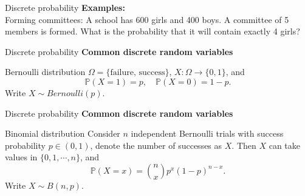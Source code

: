 \documentclass [aspectratio=169]{beamer}
\begin{document}
\begin{frame}{Discrete probability}
\textbf{Examples:}\\
Forming committees: A school has 600 girls and 400 boys. A committee of 5 members is formed. What is the probability that it will contain exactly 4 girls?
\vspace{0.1in}
\end{frame}



\begin{frame}{Discrete probability}
\textbf{Common discrete random variables}
\begin{block}{Bernoulli distribution}
$\Omega = \{\text{failure, success}\}$, $X: \Omega \to \{0,1\}$, and
$$
\mathbb{P}(X = 1) = p, \quad \mathbb{P}(X = 0) = 1 - p.
$$
Write $X \sim Bernoulli(p)$.
\end{block}
\vspace{0.1in}
\end{frame}

\begin{frame}{Discrete probability}
\textbf{Common discrete random variables}
\begin{block}{Binomial distribution}
Consider $n$ independent Bernoulli trials with success probability $p \in (0,1)$, denote the number of successes as $X$. Then $X$ can take values in $\{0, 1, \cdots, n\}$, and
$$
\mathbb{P}(X = x) = \binom{n}{x}p^x (1-p)^{n-x}.
$$
Write $X \sim B(n,p)$.
\end{block}
\vspace{0.1in}
\end{frame}
\end{document}
